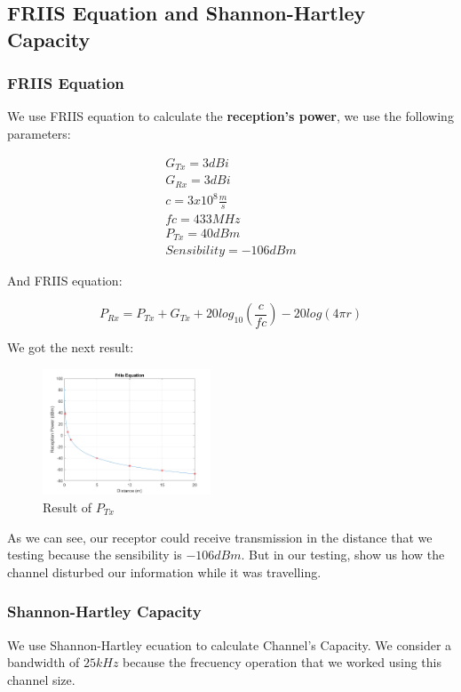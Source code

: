 \subsection{FRIIS Equation and Shannon-Hartley Capacity}
\subsubsection{FRIIS Equation}
We use FRIIS equation to calculate the \textbf{reception's power}, we use the following parameters:

\begin{align*}
	G_{Tx}= 3dBi\\
	G_{Rx}= 3dBi\\
	c = 3x10^8 \frac{m}{s} \\
	fc = 433MHz\\
	P_{Tx} = 40dBm\\
	Sensibility = -106dBm
\end{align*}

And FRIIS equation:

\begin{equation}
	P_{Rx} = P_{Tx} + G_{Tx} + 20log_{10}(\frac{c}{fc}) -20log(4\pi r)
\end{equation}

We got the next result:

\begin{figure}[!htbp]
	\centering
	\includegraphics[width=5cm]{images/friis.png}
	\caption{Result of $P_{Tx}$}
\end{figure}

As we can see, our receptor could receive transmission in the distance that we testing because the sensibility is $-106dBm$. But in our testing, show us how the channel disturbed our information while it was travelling.

\subsubsection{Shannon-Hartley Capacity}
We use Shannon-Hartley ecuation to calculate Channel's Capacity. We consider a bandwidth of $25kHz$ because the frecuency operation that we worked using this channel size. %

